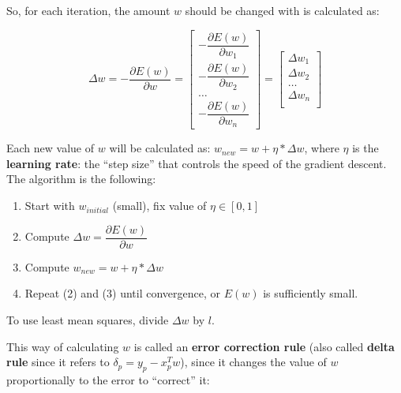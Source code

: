 So, for each iteration, the amount $w$ should be changed with is calculated as:

\begin{equation*}
    \Delta w = - \dfrac{\partial E(w)}{\partial w} =
    \begin{bmatrix}
    - \dfrac{\partial E(w)}{\partial w_1}\\
    - \dfrac{\partial E(w)}{\partial w_2}\\
    \dots\\
    - \dfrac{\partial E(w)}{\partial w_n}
    \end{bmatrix}
    =
    \begin{bmatrix}
    \Delta w_1\\
    \Delta w_2\\
    \dots\\
    \Delta w_n\\
    \end{bmatrix}
\end{equation*}

Each new value of $w$ will be calculated as: $w_{new} = w + \eta*\Delta w$, where $\eta$ is the \textbf{learning rate}: the ``step size'' that controls the speed of the gradient descent. The algorithm is the following:

\begin{enumerate}
    \item Start with $w_{initial}$ (small), fix value of $\eta \in [0,1]$

    \item Compute $\Delta w = \dfrac{\partial E(w)}{\partial w}$

    \item Compute $w_{new} = w + \eta*\Delta w$

    \item Repeat (2) and (3) until convergence, or $E(w)$ is sufficiently small.
\end{enumerate}
To use least mean squares, divide $\Delta w$ by $l$.

This way of calculating $w$ is called an \textbf{error correction rule} (also called \textbf{delta rule} since it refers to $\delta_p = y_p - x_p^Tw$), since it changes the value of $w$ proportionally to the error to ``correct'' it:

